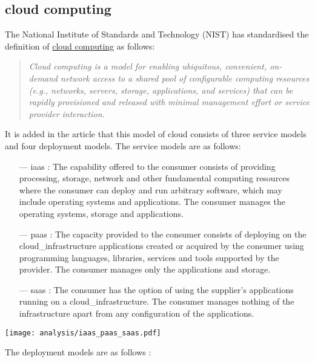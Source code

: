 \subsection{\texorpdfstring{\Gls{cloud}}{} computing}
\label{subsec:cloudcomputing}
The National Institute of Standards and Technology (NIST) \cite{nist_definition_cloud_computing} has standardised the definition of \hyperref[subsec:cloudcomputing]{cloud computing} as follows:
\begin{quote}
    \textit{Cloud computing is a model for enabling ubiquitous, convenient, on-demand network access to a shared pool of configurable computing resources (e.g., networks, servers, storage, applications, and services) that can be rapidly provisioned and released with minimal management effort or service provider interaction. \cite{nist_definition_cloud_computing}}
\end{quote}
It is added in the article \cite{nist_definition_cloud_computing} that this model of \gls{cloud} consists of three service models and four deployment models. The service models are as follows:
\begin{itemize}
    \item[—] \acrfull{iaas} : The capability offered to the consumer consists of providing processing, storage, network and other fundamental computing resources where the consumer can deploy and run arbitrary software, which may include operating systems and applications. The consumer manages the operating systems, storage and applications.
    \item[—] \acrfull{paas} : The capacity provided to the consumer consists of deploying on the \gls{cloud_infrastructure} applications created or acquired by the consumer using programming languages, libraries, services and tools supported by the provider. The consumer manages only the applications and storage.
    \item[—] \acrfull{saas} : The consumer has the option of using the supplier's applications running on a \gls{cloud_infrastructure}. The consumer manages nothing of the infrastructure apart from any configuration of the applications.
\end{itemize}
\begin{center}
    \begingroup
    \texttt{[image: analysis/iaas\_paas\_saas.pdf]}
    \label{fig:iaas_paas_saas}
    \endgroup
\end{center}
The deployment models are as follows \cite{nist_definition_cloud_computing} :
